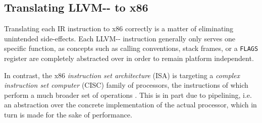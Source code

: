 \documentclass{article}
\begin{document}


\subsection{Translating LLVM-{}- to x86}

Translating each IR instruction to x86 correctly is a matter of eliminating unintended side-effects. Each LLVM-{}- instruction generally only serves one specific function, %
as concepts such as calling conventions, stack frames, or a \lstinline!FLAGS! register are completely abstracted over in order to remain platform independent.

In contrast, the x86 \textit{instruction set architecture} (ISA) is targeting a  \textit{complex instruction set computer} (CISC) family of processors, the instructions of which perform a much broader set of operations \cite[p.~190]{tiger}. This is in part due to pipelining, i.e. an abstraction over the concrete implementation of the actual processor, which in turn is made for the sake of performance.
\end{document}
